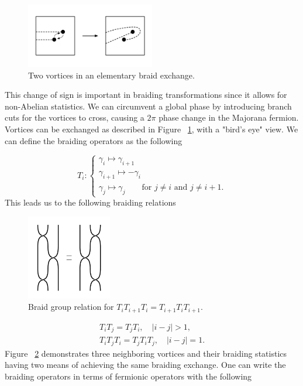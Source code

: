 \begin{figure}
  \includegraphics[width=0.5\textwidth]{./figures/pwave-braid.pdf}
  \caption{Two vortices in an elementary braid exchange.}
  \label{fig:pwave-braid}
\end{figure}


This change of sign is important in braiding transformations since it allows for non-Abelian statistics.
We can circumvent a global phase by introducing branch cuts for the vortices to cross, causing a $2\pi$ phase change in the Majorana fermion.
Vortices can be exchanged as described in Figure ~\ref{fig:pwave-braid}, with a "bird's eye" view.
We can define the braiding operators as the following

\begin{equation}
  T_i :
  \begin{cases}
    \gamma_i \mapsto \gamma_{i+1} \\
    \gamma_{i+1} \mapsto -\gamma_i \\
    \gamma_j \mapsto \gamma_j \quad\quad \text{for $j\neq i$ and $j\neq i+1$}.
  \end{cases}
\end{equation}
This leads us to the following braiding relations

\begin{figure}
  \includegraphics[width=0.33\textwidth]{./figures/braid.pdf}
  \caption{Braid group relation for $T_i T_{i+1} T_i = T_{i+1} T_i T_{i+1}$.}
  \label{fig:braid}
\end{figure}
\begin{equation}
  \begin{align*}
    T_i T_j = T_j T_i, \quad |i-j| > 1, \\
    T_i T_j T_i = T_j T_i T_j, \quad |i-j| = 1.
  \end{align*}
\end{equation}
Figure ~\ref{fig:braid} demonstrates three neighboring vortices and their braiding statistics having two means of achieving the same braiding exchange.
One can write the braiding operators in terms of fermionic operators with the following

